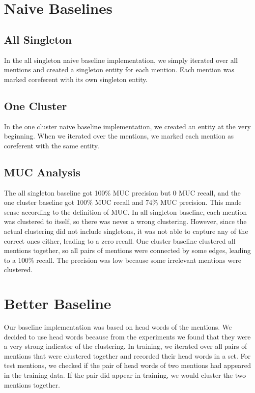\documentclass[12pt, twocolumn]{article}
\begin{document}

\section{Naive Baselines}
\subsection{All Singleton}
In the all singleton naive baseline implementation, we simply iterated over all mentions and created a singleton entity for each mention. Each mention was marked coreferent with its own singleton entity.

\subsection{One Cluster}
In the one cluster naive baseline implementation, we created an entity at the very beginning. When we iterated over the mentions, we marked each mention as coreferent with the same entity.

\subsection{MUC Analysis}
The all singleton baseline got 100\% MUC precision but 0 MUC recall, and the one cluster baseline got 100\% MUC recall and 74\% MUC precision. This made sense according to the definition of MUC. In all singleton baseline, each mention was clustered to itself, so there was never a wrong clustering. However, since the actual clustering did not include singletons, it was not able to capture any of the correct ones either, leading to a zero recall. One cluster baseline clustered all mentions together, so all pairs of mentions were connected by some edges, leading to a 100\% recall. The precision was low because some irrelevant mentions were clustered.

\section{Better Baseline}
Our baseline implementation was based on head words of the mentions. We decided to use head words because from the experiments we found that they were a very strong indicator of the clustering.
 In training, we iterated over all pairs of mentions that were clustered together and recorded their head words in a set. 
For test mentions, we checked if the pair of head words of two mentions had appeared in the training data. If the pair did appear in training, we would cluster the two mentions together.
\end{document}
